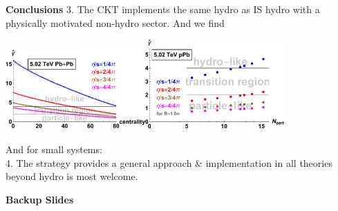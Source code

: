 \documentclass[9pt,a4paper,unknownkeysallowed,xcolor=dvipsnames,aspectratio=43]{beamer}
\begin{document}
%
%
\begin{frame}{\bf\huge Conclusions}
\setcounter{page}{0}
\vspace{2mm}
{\color{teablue}3.} {\color{darkred}The CKT implements the same hydro as IS hydro with a physically motivated non-hydro sector. And we find}\\
\vspace{2mm}
\begin{center}
\includegraphics[width=0.4\textwidth]{fig/PbPb}\hspace{0.1\textwidth}\includegraphics[width=0.4\textwidth]{fig/pPb}
\end{center}
\vspace{2mm}
And for small systems: {\color{darkred}
}\\
\vspace{4mm}
{\color{teablue}4.} {\color{darkred} The strategy provides a general approach \& implementation in all theories beyond hydro is most welcome.}
\end{frame}
%
%
\begin{frame}
\setcounter{page}{0}
\vspace*{\fill}
\begin{center}
{\Huge\bf\color{gray}Backup Slides}
\end{center}
\vspace*{\fill}
\end{frame}
%
%
%
\end{document}
